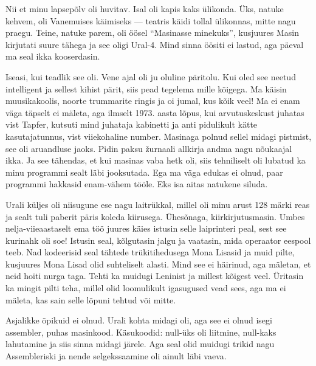 Nii et minu lapsepõlv oli huvitav. Isal oli kapis kaks ülikonda. 
Üks, natuke kehvem, oli Vanemuises käimiseks --- teatris käidi tollal ülikonnas, 
mitte nagu praegu. Teine, natuke parem, oli öösel \enquote{Masinasse 
minekuks}, kusjuures Masin kirjutati suure tähega ja see oligi 
Ural-4. Mind sinna öösiti ei lastud, aga päeval ma seal 
ikka kooserdasin. 


Iseasi, kui teadlik see oli. Vene ajal oli ju oluline 
päritolu. Kui oled see neetud intelligent ja sellest kihist pärit, 
siis pead tegelema mille kõigega. Ma käisin muusikakoolis, noorte trummarite 
ringis ja oi jumal, kus kõik veel! Ma ei enam väga täpselt ei mäleta, aga 
ilmselt 1973. aasta lõpus, kui arvutuskeskust juhatas vist Tapfer, kutsuti mind juhataja kabinetti ja anti pidulikult kätte kasutajatunnus, vist
viiekohaline number. Masinaga polnud sellel midagi pistmist, 
see oli aruandluse jaoks. Pidin paksu žurnaali allkirja 
andma nagu nõukaajal ikka. Ja see tähendas, et kui masinas 
vaba hetk oli, siis tehniliselt oli lubatud ka minu programmi sealt läbi 
jooksutada. Ega ma väga edukas ei olnud, paar programmi hakkasid
enam-vähem tööle. Eks isa aitas natukene siluda.

Urali küljes oli niisugune 
ese nagu laitrükkal, millel oli minu arust 128 märki reas 
ja sealt tuli paberit päris koleda kiirusega. Ühesõnaga, kiirkirjutusmasin. Umbes nelja-viieaastaselt ema töö
juures käies istusin selle laiprinteri peal, sest see kurinahk oli soe! 
Istusin seal, kõlgutasin jalgu ja vaatasin, mida operaator 
eespool teeb. Nad kodeerisid seal tähtede 
trükitihedusega Mona Lisasid ja muid pilte, kusjuures Mona Lisad 
olid suhteliselt alasti. Mind see ei häirinud, aga mäletan, et
neid hoiti nurga taga. Tehti ka muidugi Leninist ja millest kõigest veel. Üritasin 
ka mingit pilti teha, millel olid loomulikult igasugused vead sees, aga ma ei 
mäleta, kas sain selle lõpuni tehtud või mitte. 


Asjalikke õpikuid ei olnud. Urali kohta midagi oli, aga 
see ei olnud isegi assembler, puhas masinkood. Käsukoodid: 
null-üks oli liitmine, null-kaks lahutamine ja siis 
sinna midagi järele. Aga seal olid muidugi trikid nagu Assembleriski ja nende 
selgekssaamine oli ainult läbi vaeva. 

